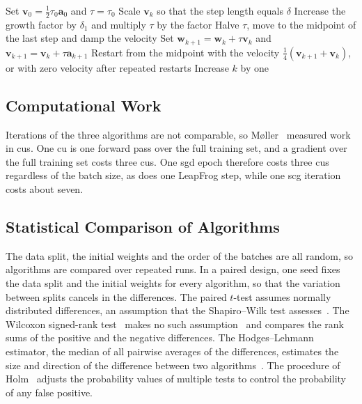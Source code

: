 \documentclass[conference]{IEEEtran}
\newcommand{\vect}[1]{\mathbf{#1}}
\begin{document}
\begin{algorithm}[t]
\caption{LeapFrog LFOP1(b)}
\label{alg:leapfrog}
\begin{algorithmic}[1]
\STATE Set $\vect{v}_0 = \frac{1}{2} \tau_0 \vect{a}_0$ and $\tau = \tau_0$
\REPEAT
\IF{the step length $\tau \lVert \vect{v}_k \rVert$ exceeds $\delta$}
\STATE Scale $\vect{v}_k$ so that the step length equals $\delta$
\ELSE
\STATE Increase the growth factor by $\delta_1$ and multiply $\tau$ by the factor
\ENDIF
{}
\STATE Halve $\tau$, move to the midpoint of the last step and damp the velocity
\ENDIF
\STATE Set $\vect{w}_{k+1} = \vect{w}_k + \tau \vect{v}_k$ and $\vect{v}_{k+1} = \vect{v}_k + \tau \vect{a}_{k+1}$
\IF{$\lVert \vect{v}_{k+1} \rVert \le \lVert \vect{v}_k \rVert$}
\STATE Restart from the midpoint with the velocity $\frac{1}{4}(\vect{v}_{k+1} + \vect{v}_k)$, or with zero velocity after repeated restarts
\ENDIF
\STATE Increase $k$ by one
\end{algorithmic}
\end{algorithm}

\subsection{Computational Work}

Iterations of the three algorithms are not comparable, so M{\o}ller~\cite{moller1993}
measured work in \glspl{cu}. One \gls{cu} is one forward pass over the
full training set, and a gradient over the full training set costs three
\glspl{cu}. One \gls{sgd} epoch therefore costs three \glspl{cu} regardless of the
batch size, as does one LeapFrog step, while one \gls{scg} iteration costs about
seven.

\subsection{Statistical Comparison of Algorithms}

The data split, the initial weights and the order of the batches are all random,
so algorithms are compared over repeated runs. In a paired design, one seed fixes
the data split and the initial weights for every algorithm, so that the variation
between splits cancels in the differences. The paired $t$-test assumes
normally distributed differences, an assumption that the Shapiro--Wilk test
assesses~\cite{shapiro1965}. The Wilcoxon signed-rank test~\cite{wilcoxon1945}
makes no such assumption~\cite{demsar2006} and compares the rank sums of the
positive and the negative differences. The Hodges--Lehmann estimator, the median of all pairwise
averages of the differences, estimates the size and direction of the difference between two
algorithms~\cite{hodges1963}.
The procedure of Holm~\cite{holm1979} adjusts the probability values of multiple
tests to control the probability of any false positive.
\end{document}
